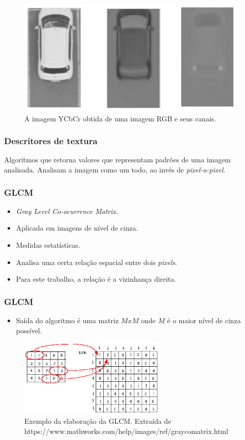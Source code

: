 \documentclass{beamer}
\begin{document}
\begin{frame}
\begin{figure}
  \centering
  \includegraphics[width=.4\linewidth]{exemploYCbCrFinal}
  \caption{A imagem YCbCr obtida de uma imagem RGB e seus canais.}
\end{figure}
\end{frame}

\begin{frame}
\frametitle{Descritores de textura}
\begin{block}{}
Algoritmos que retorna valores que representam padrões de uma imagem analisada. Analisam a imagem como um todo, ao invés de \textit{pixel-a-pixel}.
\end{block}
\end{frame}

\begin{frame}
\frametitle{GLCM}
\begin{itemize}
\item \textit{Gray Level Co-ocurrence Matrix}.
\item Aplicada em imagens de nível de cinza.
\item Medidas estatísticas.
\item Analisa uma certa relação espacial entre dois \textit{pixels}.
\item Para este trabalho, a relação é a vizinhança direita.
\end{itemize}
\end{frame}

\begin{frame}
\frametitle{GLCM}
\begin{itemize}
\item Saída do algoritmo é uma matriz $MxM$ onde $M$ é o maior nível de cinza possível.
\end{itemize}

\begin{figure}
\includegraphics[width=7cm]{GLCM} 
\centering
\caption{Exemplo da elaboração da GLCM. Extraída de https://www.mathworks.com/help/images/ref/graycomatrix.html}
\label{fig:GLCM}
\end{figure}
\end{frame}
\end{document}
